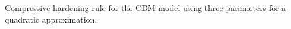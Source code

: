 \label{fig:conccomp} Compressive hardening rule for the CDM model using three parameters
for a quadratic approximation.
